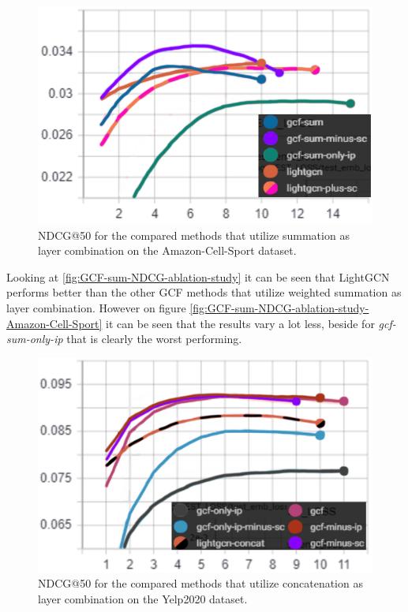 \begin{figure}[h!]
    \includegraphics[width=\linewidth]{figures/amazon-cell-sport-gcf-sum-ndcg.png}
    \caption{NDCG@50 for the compared methods that utilize summation as layer combination on the Amazon-Cell-Sport dataset.}
    \label{fig:GCF-sum-NDCG-ablation-study-Amazon-Cell-Sport}
\end{figure}
Looking at \autoref{fig:GCF-sum-NDCG-ablation-study} it can be seen that LightGCN performs better than the other GCF methods that utilize weighted summation as layer combination.
However on figure \autoref{fig:GCF-sum-NDCG-ablation-study-Amazon-Cell-Sport} it can be seen that the results vary a lot less, beside for \textit{gcf-sum-only-ip} that is clearly the worst performing.
\begin{figure}[h!]
    \includegraphics[width=\linewidth]{figures/gcf-ndcg-concat.png}
    \caption{NDCG@50 for the compared methods that utilize concatenation as layer combination on the Yelp2020 dataset.}
    \label{fig:GCF-NDCG-concat-ablation-study}
\end{figure}
